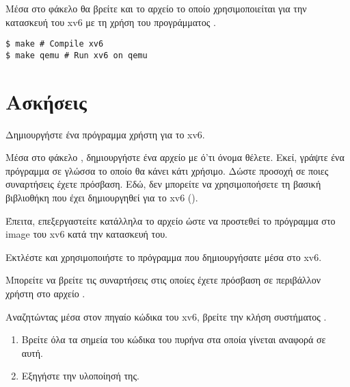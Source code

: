 \documentclass[18pt]{extarticle}
\begin{document}
Μέσα στο φάκελο  θα βρείτε και το αρχείο  το οποίο χρησιμοποιείται για την κατασκευή του xv6 με τη χρήση του προγράμματος .

\begin{commandline}
\begin{verbatim}
$ make # Compile xv6
$ make qemu # Run xv6 on qemu
\end{verbatim}
\end{commandline}

\section{Ασκήσεις}

\begin{question}
    Δημιουργήστε ένα πρόγραμμα χρήστη για το xv6.

    Μέσα στο φάκελο , δημιουργήστε ένα αρχείο με ό'τι όνομα θέλετε. Εκεί, γράψτε ένα πρόγραμμα
    σε γλώσσα  το οποίο θα κάνει κάτι χρήσιμο. Δώστε προσοχή 
    σε ποιες συναρτήσεις έχετε πρόσβαση. Εδώ, δεν μπορείτε να χρησιμοποήσετε τη βασική βιβλιοθήκη που έχει δημιουργηθεί για το xv6 ().

    Έπειτα, επεξεργαστείτε κατάλληλα το αρχείο  ώστε να προστεθεί το πρόγραμμα στο image του xv6 κατά την κατασκευή του.

    Εκτλέστε  και χρησιμοποιήστε το πρόγραμμα που δημιουργήσατε μέσα στο xv6.

    \begin{info}[Σημείωση:]
        Μπορείτε να βρείτε τις συναρτήσεις στις οποίες έχετε πρόσβαση σε περιβάλλον χρήστη στο αρχείο .
    \end{info}

\end{question}

\begin{question}
    Αναζητώντας μέσα στον πηγαίο κώδικα του xv6, βρείτε την 
    κλήση συστήματος .

    \begin{enumerate}
        \item Βρείτε όλα τα σημεία του κώδικα του πυρήνα στα οποία γίνεται αναφορά σε αυτή.
        \item Εξηγήστε την υλοποίησή της.
    \end{enumerate}
\end{question}
\end{document}
